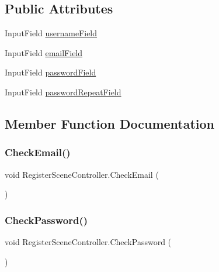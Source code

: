 \subsection*{Public Attributes}
\begin{DoxyCompactItemize}
\item 
Input\+Field \hyperlink{classRegisterSceneController_ac27f7ab56f00b3713652c2d136e85421}{username\+Field}
\item 
Input\+Field \hyperlink{classRegisterSceneController_a99889a309513341744100dcb7d7c569b}{email\+Field}
\item 
Input\+Field \hyperlink{classRegisterSceneController_a0064121ad74ca0ba4d72fad144c19049}{password\+Field}
\item 
Input\+Field \hyperlink{classRegisterSceneController_a69afc78a2738889c4b0761405d630a1e}{password\+Repeat\+Field}
\end{DoxyCompactItemize}


\subsection{Member Function Documentation}
\mbox{\label{classRegisterSceneController_a3a3da6d880ef88abb72811fbd18a893b}} 
\subsubsection{\texorpdfstring{Check\+Email()}{CheckEmail()}}
{\footnotesize\ttfamily void Register\+Scene\+Controller.\+Check\+Email (\begin{DoxyParamCaption}{ }\end{DoxyParamCaption})\hspace{0.3cm}{\ttfamily [inline]}}

\mbox{\label{classRegisterSceneController_a6a534733d442b967c58b229423b6b71d}} 
\subsubsection{\texorpdfstring{Check\+Password()}{CheckPassword()}}
{\footnotesize\ttfamily void Register\+Scene\+Controller.\+Check\+Password (\begin{DoxyParamCaption}{ }\end{DoxyParamCaption})\hspace{0.3cm}{\ttfamily [inline]}}



